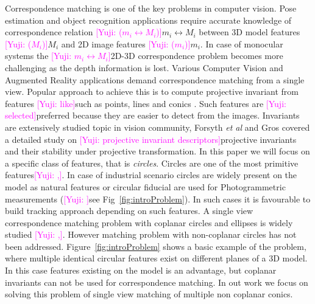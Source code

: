 \documentclass{bmvc2k}
\newcommand{\yuji}[1]{\textcolor{magenta}{[Yuji: #1]}}
\newcommand{\fref}[1]{Fig\bmvaOneDot~\ref{#1}}
\newcommand{\Fref}[1]{Figure~\ref{#1}}
\def\etal{\emph{et al}\bmvaOneDot}
\begin{document}
Correspondence matching is one of the key problems in computer vision.
Pose estimation and object recognition applications require accurate knowledge of correspondence relation \yuji{($ m_i \leftrightarrow M_i $)}{$ m_i \leftrightarrow M_i $} between 3D model features \yuji{($ M_i $)}{$ M_i $} and 2D image features \yuji{($ m_i $)}{$ m_i $}. 
In case of monocular systems the \yuji{$ m_i \leftrightarrow M_i $}{2D-3D correspondence} problem becomes more challenging as the depth information is lost.
Various Computer Vision and Augmented Reality applications demand correspondence matching from a single view.
Popular approach to achieve this is to compute projective invariant from features \yuji{like}{such as} points, lines and conics \cite{hartley_multiple_2003}.
Such features are \yuji{selected}{preferred} because they are easier to detect from the images. 
Invariants are extensively studied topic in vision community, Forsyth \etal \cite{forsyth_91} and Gros \cite{gros_projective_1992} covered a detailed study on \yuji{projective invariant descriptors}{projective invariants} and their stability under projective transformation. 
In this paper we will focus on a specific class of features, that is \textit{circles}. 
Circles are one of the most primitive features\yuji{,}{.}
In case of industrial scenario circles are widely present on the model as natural features or circular fiducial are used for Photogrammetric measurements \cite{luhmann_close_2006} (\yuji{}{see} \fref{fig:introProblem}).
In such cases it is favourable to build tracking approach depending on such features. 
A single view correspondence matching problem with coplanar circles and ellipses is widely studied \cite{lepetit_monocular_2005}\yuji{,}{.}
However matching problem with non-coplanar circles has not been addressed. 
\Fref{fig:introProblem} shows a basic example of the problem, where multiple identical circular features exist on different planes of a 3D model.
In this case features existing on the model is an advantage, but coplanar invariants can not be used for correspondence matching.
In out work we focus on solving this problem of single view matching of multiple non coplanar conics. 

\end{document}
